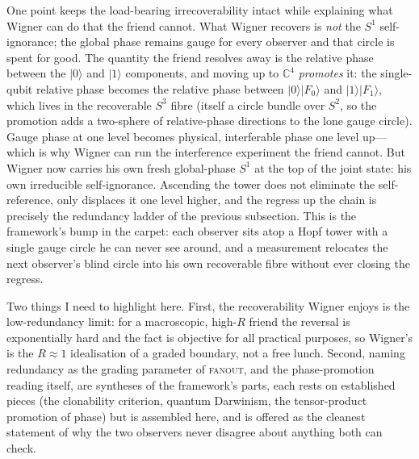 \documentclass{article}
\begin{document}
One point keeps the load-bearing irrecoverability intact while explaining what
Wigner can do that the friend cannot. What Wigner recovers is \emph{not} the
$S^{1}$ self-ignorance; the global phase remains gauge for every observer and that
circle is spent for good. The quantity the friend resolves away is the relative
phase between the $\lvert 0\rangle$ and $\lvert 1\rangle$ components, and moving up
to $\mathbb{C}^{4}$ \emph{promotes} it: the single-qubit relative phase becomes the
relative phase between $\lvert 0\rangle\lvert F_{0}\rangle$ and
$\lvert 1\rangle\lvert F_{1}\rangle$, which lives in the recoverable $S^{3}$ fibre
(itself a circle bundle over $S^{2}$, so the promotion adds a two-sphere of
relative-phase directions to the lone gauge circle). Gauge phase at one level
becomes physical, interferable phase one level up---which is why Wigner can run
the interference experiment the friend cannot. But Wigner now carries his own
fresh global-phase $S^{1}$ at the top of the joint state: his own irreducible
self-ignorance. Ascending the tower does not eliminate the self-reference, only
displaces it one level higher, and the regress up the chain is precisely the
redundancy ladder of the previous subsection. This is the framework's bump in the
carpet: each observer sits atop a Hopf tower with a single gauge circle he can
never see around, and a measurement relocates the next observer's blind circle
into his own recoverable fibre without ever closing the regress.

Two things I need to highlight here. First, the recoverability Wigner
enjoys is the low-redundancy limit: for a macroscopic, high-$R$ friend the
reversal is exponentially hard and the fact is objective for all practical
purposes, so Wigner's  is the $R\!\approx\!1$ idealisation of a
graded boundary, not a free lunch. Second, naming redundancy as the grading
parameter of \textsc{fanout}, and the phase-promotion reading itself, are
syntheses of the framework's parts, each rests on established pieces (the
clonability criterion, quantum Darwinism, the tensor-product promotion of phase)
but is assembled here, and is offered as the cleanest statement of why the two
observers never disagree about anything both can check.

\end{document}
